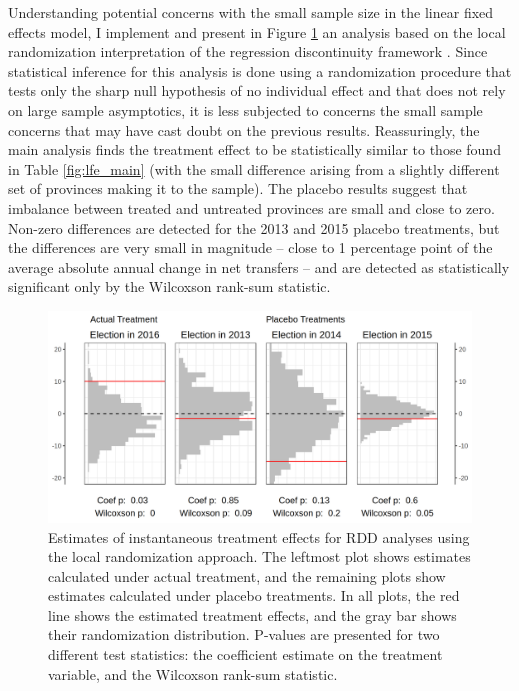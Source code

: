 \documentclass[12pt]{article}
\newcommand{\1}{\mathbbm{1}}
\begin{document}
Understanding potential concerns with the small sample size in the linear fixed effects model, I implement and present in Figure \ref{fig:rdd_placebo} an analysis based on the local randomization interpretation of the regression discontinuity framework \citep{CattaneoTitiunik2015}. Since statistical inference for this analysis is done using a randomization procedure that tests only the sharp null hypothesis of no individual effect and that does not rely on large sample asymptotics, it is less subjected to concerns the small sample concerns that may have cast doubt on the previous results. Reassuringly, the main analysis finds the treatment effect to be statistically similar to those found in Table \ref{fig:lfe_main} (with the small difference arising from a slightly different set of provinces making it to the sample). The placebo results suggest that imbalance between treated and untreated provinces are small and close to zero. Non-zero differences are detected for the 2013 and 2015 placebo treatments, but the differences are very small in magnitude -- close to 1 percentage point of the average absolute annual change in net transfers -- and are detected as statistically significant only by the Wilcoxson rank-sum statistic. 

\begin{figure}[!htbp]
	\centering
	\includegraphics[width=\textwidth]{figure/190311_rdd_results.png}
	\captionsetup{singlelinecheck=off}
	\caption[Estimated RDD treatment effects]{Estimates of instantaneous treatment effects for RDD analyses using the local randomization approach. The leftmost plot shows estimates calculated under actual treatment, and the remaining plots show estimates calculated under placebo treatments. In all plots, the red line shows the estimated treatment effects, and the gray bar shows their randomization distribution. P-values are presented for two different test statistics: the coefficient estimate on the treatment variable, and the Wilcoxson rank-sum statistic.}
	\label{fig:rdd_placebo}
\end{figure}
\end{document}

